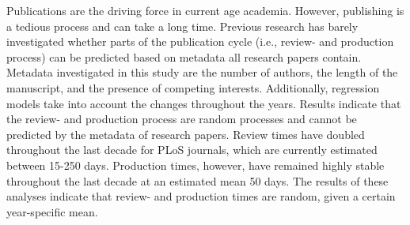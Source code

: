 Publications are the driving force in current age academia. However, publishing is a tedious process and can take a long time. Previous research has barely investigated whether parts of the publication cycle (i.e., review- and production process) can be predicted based on metadata all research papers contain. Metadata investigated in this study are the number of authors, the length of the manuscript, and the presence of competing interests. Additionally, regression models take into account the changes throughout the years. Results indicate that the review- and production process are random processes and cannot be predicted by the metadata of research papers. Review times have doubled throughout the last decade for PLoS journals, which are currently estimated between 15-250 days. Production times, however, have remained highly stable throughout the last decade at an estimated mean 50 days. The results of these analyses indicate that review- and production times are random, given a certain year-specific mean. 